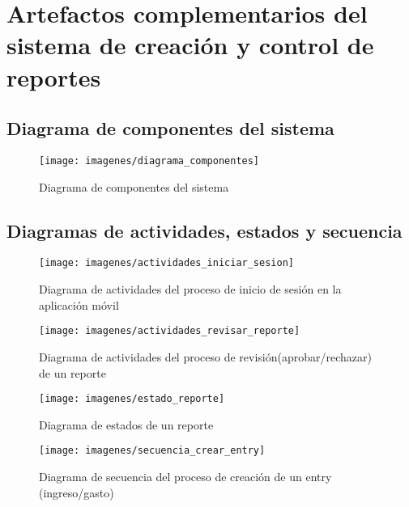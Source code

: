 \chapter{Artefactos complementarios del sistema de creación y control de reportes}\label{chap:Artefactos complementarios}

\section{Diagrama de componentes del sistema}

\begin{landscape}
\begin{figure}
  \centering
  \texttt{[image: imagenes/diagrama\_componentes]}
  \caption{Diagrama de componentes del sistema}
  \label{fig:componentesSistema}
\end{figure}
\end{landscape}


\section{Diagramas de actividades, estados y secuencia}

\begin{figure}[ht]
  \centering
  \texttt{[image: imagenes/actividades\_iniciar\_sesion]}
  \caption{Diagrama de actividades del proceso de inicio de sesión en la aplicación móvil}
  \label{fig:actividadesIniciarSesion}
\end{figure}

\begin{figure}[ht]
  \centering
  \texttt{[image: imagenes/actividades\_revisar\_reporte]}
  \caption{Diagrama de actividades del proceso de revisión(aprobar/rechazar) de un reporte}
  \label{fig:actividadesRevisarReporte}
\end{figure}


\begin{figure}[ht]
  \centering
  \texttt{[image: imagenes/estado\_reporte]}
  \caption{Diagrama de estados de un reporte}
  \label{fig:estadoReporte}
\end{figure}

\begin{landscape}
\begin{figure}
  \centering
  \texttt{[image: imagenes/secuencia\_crear\_entry]}
  \caption{Diagrama de secuencia del proceso de creación de un entry (ingreso/gasto)}
  \label{fig:secuenciaCrearEntry}
\end{figure}
\end{landscape}

